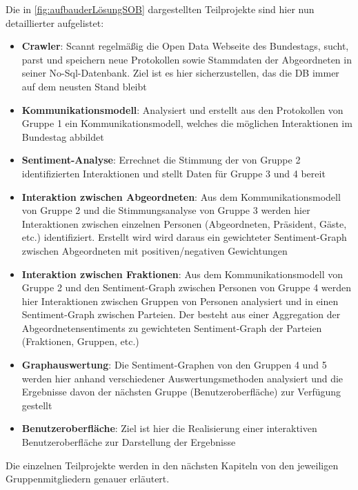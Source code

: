 Die in \autoref{fig:aufbauderLösungSOB} dargestellten Teilprojekte sind hier nun detaillierter aufgelistet:
\begin{itemize}
    \item \textbf{Crawler}: Scannt regelmäßig die Open Data Webseite des Bundestags, sucht, parst und speichern neue Protokollen sowie Stammdaten der Abgeordneten in seiner No-Sql-Datenbank. Ziel ist es hier sicherzustellen, das die DB immer auf dem neusten Stand bleibt
    \item \textbf{Kommunikationsmodell}: Analysiert und erstellt aus den
      Protokollen von Gruppe 1 ein Kommunikationsmodell, welches die möglichen
      Interaktionen im Bundestag abbildet
    \item \textbf{Sentiment-Analyse}: Errechnet die Stimmung der von Gruppe 2 identifizierten Interaktionen und stellt Daten für Gruppe 3 und 4 bereit
    \item \textbf{Interaktion zwischen Abgeordneten}: Aus dem Kommunikationsmodell von Gruppe 2 und die Stimmungsanalyse von Gruppe 3 werden hier Interaktionen zwischen einzelnen Personen (Abgeordneten, Präsident, Gäste, etc.) identifiziert. Erstellt wird wird daraus ein gewichteter Sentiment-Graph zwischen Abgeordneten mit positiven/negativen Gewichtungen
    \item \textbf{Interaktion zwischen Fraktionen}: Aus dem Kommunikationsmodell von Gruppe 2 und den Sentiment-Graph zwischen Personen von Gruppe 4 werden hier Interaktionen zwischen Gruppen von Personen analysiert und in einen Sentiment-Graph zwischen Parteien. Der besteht aus einer Aggregation der Abgeordnetensentiments zu gewichteten Sentiment-Graph der Parteien (Fraktionen, Gruppen, etc.)
    \item \textbf{Graphauswertung}: Die Sentiment-Graphen von den Gruppen 4 und 5 werden hier anhand verschiedener Auswertungsmethoden analysiert und die Ergebnisse davon der nächsten Gruppe (Benutzeroberfläche) zur Verfügung gestellt
    \item \textbf{Benutzeroberfläche}: Ziel ist hier die Realisierung einer interaktiven Benutzeroberfläche zur Darstellung der Ergebnisse
\end{itemize}

Die einzelnen Teilprojekte werden in den nächsten Kapiteln von den jeweiligen Gruppenmitgliedern genauer erläutert.
